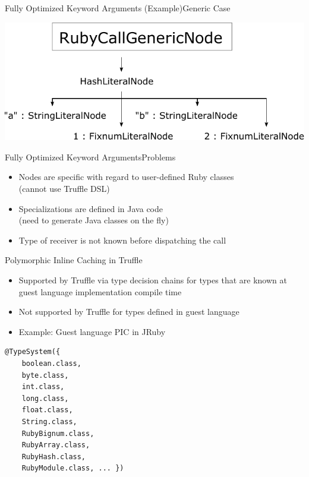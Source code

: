 \documentclass[xcolor=dvipsname,handout]{beamer} %
\begin{document}
\begin{frame}{Fully Optimized Keyword Arguments (Example)}{Generic Case}
\begin{table}
    \centering
    \includegraphics[width=\textwidth]{kwargs_generic.pdf}
\end{table}
\end{frame}

\begin{frame}{Fully Optimized Keyword Arguments}{Problems}
\begin{itemize}
    \item Nodes are specific with regard to user-defined Ruby classes \\ (cannot use Truffle DSL)
    \item Specializations are defined in Java code \\ (need to generate Java classes on the fly)
    \item Type of receiver is not known before dispatching the call
\end{itemize}
\end{frame}

\begin{frame}[fragile]{Polymorphic Inline Caching in Truffle}
\begin{itemize}
    \item Supported by Truffle via type decision chains for types that are known at guest language implementation compile time
    \item Not supported by Truffle for types defined in guest language
    \item Example: Guest language PIC in JRuby
\end{itemize}

\begin{table}
\begin{lstlisting}
@TypeSystem({
    boolean.class,
    byte.class,
    int.class,
    long.class,
    float.class,
    String.class,
    RubyBignum.class,
    RubyArray.class,
    RubyHash.class,
    RubyModule.class, ... })
\end{lstlisting}
\end{table}
\end{frame}
\end{document}
